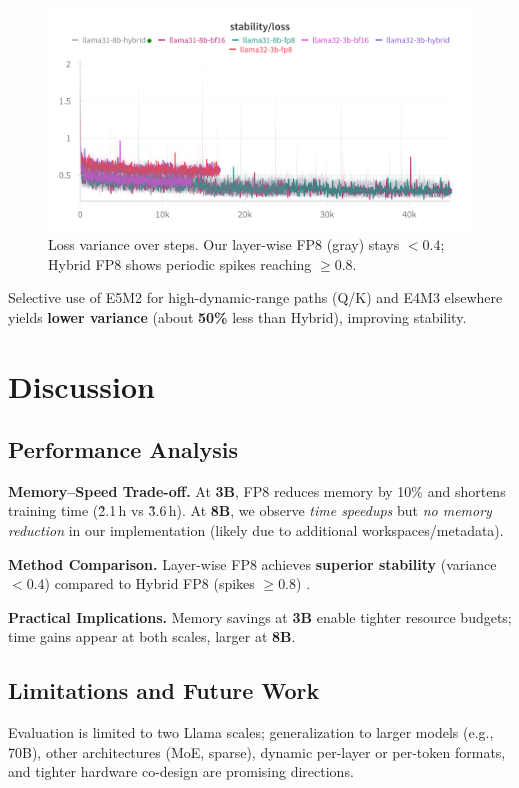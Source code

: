 \documentclass[conference]{IEEEtran}
\begin{document}
\begin{figure}[htbp]
    \centering
    \includegraphics[width=1\columnwidth]{numeric_stability.png}
    \caption{Loss variance over steps. Our layer-wise FP8 (gray) stays \textbf{$<0.4$}; Hybrid FP8 shows periodic spikes reaching $\ge 0.8$.}
    \label{fig:stability_analysis}
\end{figure}

Selective use of E5M2 for high-dynamic-range paths (Q/K) and E4M3 elsewhere yields \textbf{lower variance} (about \textbf{50\%} less than Hybrid), improving stability.

\section{Discussion}

\subsection{Performance Analysis}
\textbf{Memory--Speed Trade-off.} At \textbf{3B}, FP8 reduces memory by 10\% and shortens training time (\~2.1\,h vs \~3.6\,h). At \textbf{8B}, we observe \emph{time speedups} but \emph{no memory reduction} in our implementation (likely due to additional workspaces/metadata).

\textbf{Method Comparison.} Layer-wise FP8 achieves \textbf{superior stability} (variance $<0.4$) compared to Hybrid FP8 (spikes $\ge 0.8$) \cite{nvidia2024mxfp8,TE2025}.

\textbf{Practical Implications.} Memory savings at \textbf{3B} enable tighter resource budgets; time gains appear at both scales, larger at \textbf{8B}.

\subsection{Limitations and Future Work}
Evaluation is limited to two Llama scales; generalization to larger models (e.g., 70B), other architectures (MoE, sparse), dynamic per-layer or per-token formats, and tighter hardware co-design are promising directions.
\end{document}
